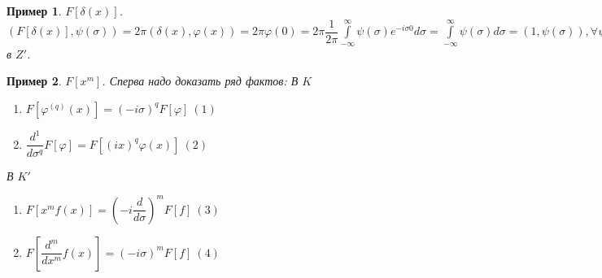 \documentclass[9pt, a4paper]{article}
\newtheorem*{sample}{Пример}
\begin{document}
		\begin{sample}
			$F[\delta(x)]$. $(F[\delta(x)], \psi(\sigma)) = 2\pi(\delta(x), \varphi(x)) = 2\pi \varphi(0) = 2\pi \dfrac{1}{2\pi} \int\limits_{-\infty}^{\infty} \psi(\sigma) e^{-i\sigma 0} d\sigma = \int\limits_{-\infty}^{\infty} \psi(\sigma) d\sigma = (1, \psi(\sigma)), \forall \psi \in Z \Rightarrow F[\delta(x)] = 1$ в $Z'$.
		\end{sample}
		\begin{sample}
			$F[x^m]$. Сперва надо доказать ряд фактов:\newline
			В $K$ 
			\begin{enumerate}
				\item $F[\varphi^{(q)}(x)] = (-i\sigma)^q F[\varphi]\ (1)$
				\item $\dfrac{d^1}{d\sigma^q}F[\varphi]= F[(ix)^q \varphi(x)] \ (2)$
			\end{enumerate}		
			В $K'$
			\begin{enumerate}
				\item $F[x^mf(x)] = (-i\dfrac{d}{d\sigma})^m F[f] \ (3)$
				\item $F[\dfrac{d^m}{dx^m}f(x)] = (-i\sigma)^m F[f] \ (4)$
			\end{enumerate}
			
		\end{sample}
\end{document}
